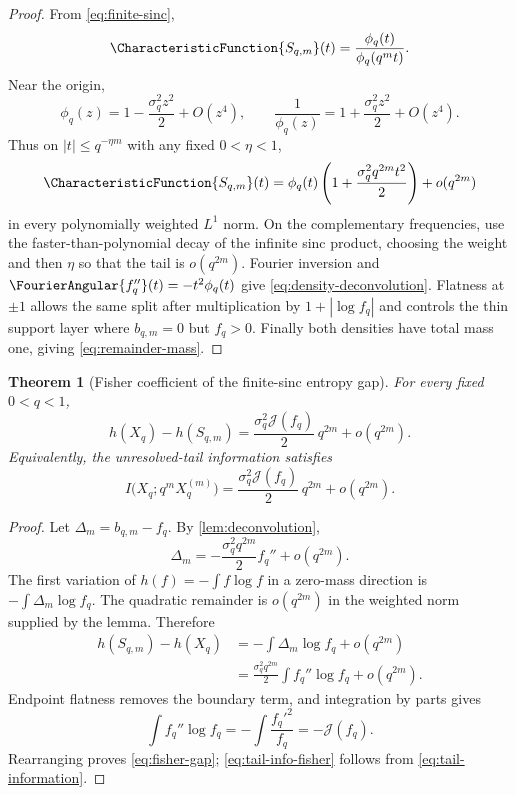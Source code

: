 \documentclass[11pt,oneside]{article}
\newtheorem{theorem}{Theorem}[section]
\theoremstyle{definition}
\theoremstyle{remark}
\begin{document}
\begin{proof}
From \eqref{eq:finite-sinc},
\[
 \CharacteristicFunction{S_{q,m}}(t)=\frac{\phi_q(t)}{\phi_q(q^mt)}.
\]
Near the origin,
\[
 \phi_q(z)=1-\frac{\sigma_q^2z^2}{2}+O(z^4),
 \qquad
 \frac1{\phi_q(z)}=1+\frac{\sigma_q^2z^2}{2}+O(z^4).
\]
Thus on $|t|\le q^{-\eta m}$ with any fixed $0<\eta<1$,
\[
 \CharacteristicFunction{S_{q,m}}(t)
 =\phi_q(t)\left(1+\frac{\sigma_q^2q^{2m}t^2}{2}
\right)
 +o(q^{2m})
\]
in every polynomially weighted $L^1$ norm.  On the complementary frequencies,
use the faster-than-polynomial decay of the infinite sinc product, choosing the
weight and then $\eta$ so that the tail is $o(q^{2m})$.  Fourier inversion and
$\FourierAngular{f_q''}(t)=-t^2\phi_q(t)$ give
\eqref{eq:density-deconvolution}.  Flatness at $\pm1$ allows the same split after
multiplication by $1+|\log f_q|$ and controls the thin support layer where
$b_{q,m}=0$ but $f_q>0$.  Finally both densities have total mass one, giving
\eqref{eq:remainder-mass}.
\end{proof}

\begin{theorem}[Fisher coefficient of the finite-sinc entropy gap]
\label{thm:fisher-gap}
For every fixed $0<q<1$,
\begin{equation}
 \boxed{
 h(X_q)-h(S_{q,m})
 =\frac{\sigma_q^2\mathcal J(f_q)}{2}\,q^{2m}
 +o(q^{2m}).}
 \label{eq:fisher-gap}
\end{equation}
Equivalently, the unresolved-tail information satisfies
\begin{equation}
 I\bigl(X_q;q^mX_q^{(m)}\bigr)
 =\frac{\sigma_q^2\mathcal J(f_q)}{2}\,q^{2m}
 +o(q^{2m}).
 \label{eq:tail-info-fisher}
\end{equation}
\end{theorem}

\begin{proof}
Let $\Delta_m=b_{q,m}-f_q$.  By \cref{lem:deconvolution},
\[
 \Delta_m=-\frac{\sigma_q^2q^{2m}}2f_q''+o(q^{2m}).
\]
The first variation of $h(f)=-\int f\log f$ in a zero-mass direction is
$-\int\Delta_m\log f_q$.  The quadratic remainder is $o(q^{2m})$ in the weighted
norm supplied by the lemma.  Therefore
\begin{align*}
 h(S_{q,m})-h(X_q)
 &=-\int\Delta_m\log f_q+o(q^{2m})\\
 &=\frac{\sigma_q^2q^{2m}}2\int f_q''\log f_q+o(q^{2m}).
\end{align*}
Endpoint flatness removes the boundary term, and integration by parts gives
\[
 \int f_q''\log f_q=-\int\frac{f_q'^2}{f_q}=-\mathcal J(f_q).
\]
Rearranging proves \eqref{eq:fisher-gap};
\eqref{eq:tail-info-fisher} follows from \eqref{eq:tail-information}.
\end{proof}
\end{document}
